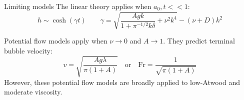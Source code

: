 \documentclass[12pt]{beamer}
\begin{document}
\begin{frame}{Limiting models}
The linear theory applies when $a_0, t << 1$:
\begin{equation*}
h \sim \cosh(\gamma t) \qquad \gamma = \sqrt{\frac{A g k}{1+\pi^{-1/2} k \delta} + \nu^2 k^4} - (\nu + D)k^2
\end{equation*}

Potential flow models apply when $\nu \rightarrow 0$ and $A \rightarrow 1$.  They predict terminal bubble velocity:
\begin{equation*}
v = \sqrt{\frac{A g \lambda}{\pi (1+A)}} \quad \text{or} \quad \text{Fr} = \frac{1}{\sqrt{\pi (1 + A)}}
\end{equation*}
However, these potential flow models are broadly applied to low-Atwood and moderate viscosity.
\end{frame}

\end{document}
